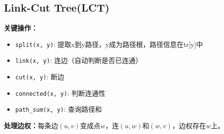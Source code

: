 \documentclass[a4paper, fontset=none]{ctexart}
\begin{document}
\subsection{Link-Cut Tree(LCT)}
\textbf{关键操作：}
\begin{itemize}
\item \texttt{split(x, y)}: 提取x到y路径，y成为路径根，路径信息在tr[y]中
\item \texttt{link(x, y)}: 连边（自动判断是否已连通）
\item \texttt{cut(x, y)}: 断边
\item \texttt{connected(x, y)}: 判断连通性
\item \texttt{path\_sum(x, y)}: 查询路径和
\end{itemize}

\textbf{处理边权：}每条边$(u, v)$变成点$w$，连$(u, w)$和$(w, v)$，边权存在$w$上。
\end{document}
